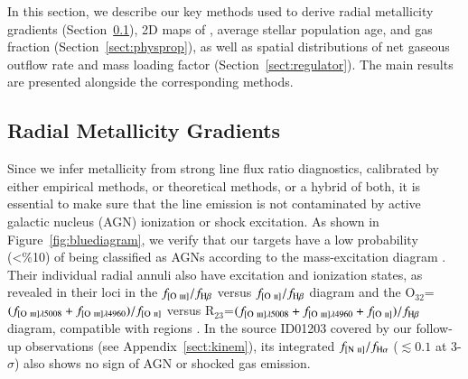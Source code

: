 In this section, we describe our key methods used to derive radial metallicity gradients (Section~\ref{sect:metalgrad}), 2D maps 
of \SFR, average stellar population age, and gas fraction (Section~\ref{sect:physprop}), as well as spatial 
distributions of net gaseous outflow rate and mass loading factor (Section~\ref{sect:regulator}).
The main results are presented alongside the corresponding methods.


\subsection{Radial Metallicity Gradients}\label{sect:metalgrad}

Since we infer metallicity from strong line flux ratio diagnostics, calibrated by either empirical methods, or 
theoretical methods, or a hybrid of both, it is essential to make sure that the line emission is not 
contaminated by active galactic nucleus (AGN) ionization or shock excitation.
As shown in Figure~\ref{fig:bluediagram}, we verify that our targets have a low probability (<\%10) of being 
classified as AGNs according to the mass-excitation diagram \citep{Juneau:2014ca}.
Their individual radial annuli also have excitation and ionization states, as revealed in their loci in the 
$f_{[\textrm{O}~\textsc{iii}]}/f_{\textrm{H}\beta}$ versus $f_{[\textrm{O}~\textsc{ii}]}/f_{\textrm{H}\beta}$ diagram and the 
O$_{32}$=$(f_{[\textrm{O}~\textsc{iii}]\lambda5008}+f_{[\textrm{O}~\textsc{iii}]\lambda4960})/f_{[\textrm{O}~\textsc{ii}]}$ versus R$_{23}$=$(f_{[\textrm{O}~\textsc{iii}]\lambda5008} + 
f_{[\textrm{O}~\textsc{iii}]\lambda4960} + f_{[\textrm{O}~\textsc{ii}]})/f_{\textrm{H}\beta}$ diagram,
compatible with \HII regions \citep{Lamareille:2004jk,Rodrigues:2012dr,2015ApJ...813..126J}.
In the source ID01203 covered by our follow-up \osiris observations (see Appendix~\ref{sect:kinem}), its 
integrated $f_{[\textrm{N}~\textsc{ii}]}/f_{\textrm{H}\alpha}$ ($\lesssim0.1$ at 3-$\sigma$) also shows no sign of AGN or shocked gas emission.

